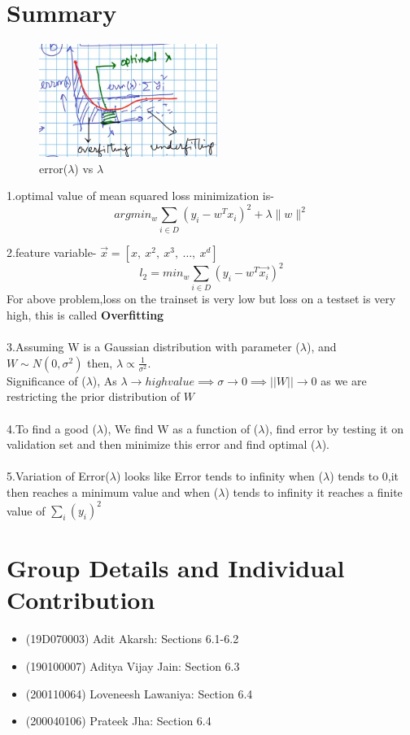 \documentclass[11pt, twosides]{article}
\begin{document}
\newpage
\section{Summary}
\begin{figure}[h]
    \centering
    \includegraphics[width = 5.8cm]{Model complexity.png}
    \caption{error($\lambda$) vs $\lambda$}
\end{figure}
1.optimal value of mean squared loss minimization is-
$$ argmin_w \sum_{i \in D} (y_i- w^Tx_i)^2 + \lambda \|w\|^2$$

2.feature variable- $ \overrightarrow{x} = [x,\ x^2,\ x^3,\ \ldots,\ x^d]$
$$l_2 = min_w \sum_{i \in D} (y_i-w^T\overrightarrow{x_i})^2$$
For above problem,loss on the trainset is very low but loss on a testset is very high, this is called \textbf{Overfitting}\\
\\
3.Assuming W is a Gaussian distribution with parameter ($\lambda$), and $W \sim N(0,\sigma^2)$ then, $\lambda \propto \frac{1}{\sigma^2}$.\\
Significance of ($\lambda$), As $\lambda \rightarrow high value \implies \sigma \rightarrow 0 \implies ||W|| \rightarrow 0$ as we are restricting the prior distribution of $W$\\
\\
4.To find a good ($\lambda$), We find W as a function of ($\lambda$), find error by testing it on validation set and then minimize this error and find optimal ($\lambda$).\\
\\
5.Variation of Error($\lambda$) looks like Error tends to infinity when ($\lambda$) tends to 0,it then reaches a minimum value and when ($\lambda$) tends to infinity it reaches a finite value of $\sum_i (y_i)^2 $

\section{Group Details and Individual Contribution}
\begin{itemize}
    \item (19D070003) Adit Akarsh: Sections 6.1-6.2
    \item (190100007) Aditya Vijay Jain:  Section 6.3
    \item (200110064) Loveneesh Lawaniya: Section 6.4 
    \item (200040106) Prateek Jha: Section 6.4
\end{itemize}



\end{document}
